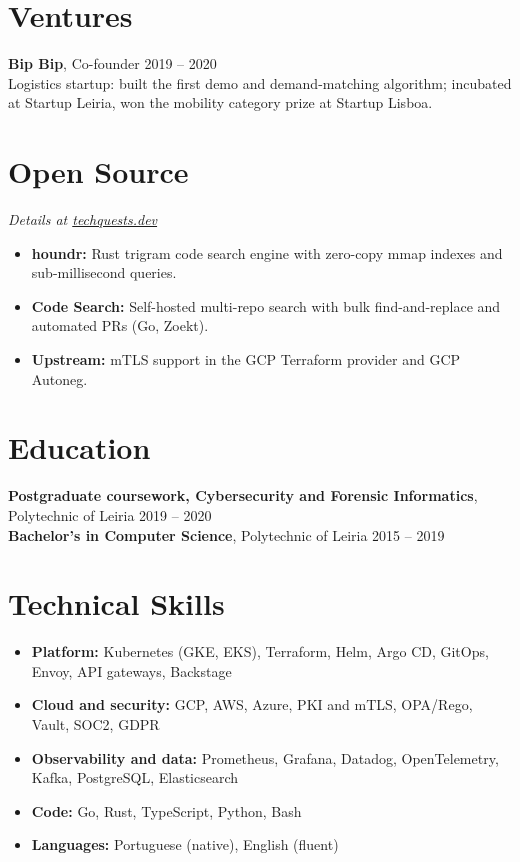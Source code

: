 \documentclass[a4paper,10pt]{article}
\newcommand{\mysectionrule}{\vspace{-4pt}\noindent{\color{rule}\rule{\linewidth}{0.5pt}}\par\vspace{4pt}}
\begin{document}
\section*{Ventures}
\mysectionrule
\textbf{Bip Bip}, Co-founder \hfill 2019 -- 2020 \\
Logistics startup: built the first demo and demand-matching algorithm; incubated at Startup Leiria, won the mobility category prize at Startup Lisboa.

\section*{Open Source}
\mysectionrule
\textit{Details at \href{https://techquests.dev}{techquests.dev}}
\begin{itemize}
  \item \textbf{houndr:} Rust trigram code search engine with zero-copy mmap indexes and sub-millisecond queries.
  \item \textbf{Code Search:} Self-hosted multi-repo search with bulk find-and-replace and automated PRs (Go, Zoekt).
  \item \textbf{Upstream:} mTLS support in the GCP Terraform provider and GCP Autoneg.
\end{itemize}

\section*{Education}
\mysectionrule
\textbf{Postgraduate coursework, Cybersecurity and Forensic Informatics}, Polytechnic of Leiria \hfill 2019 -- 2020 \\
\textbf{Bachelor's in Computer Science}, Polytechnic of Leiria \hfill 2015 -- 2019

\section*{Technical Skills}
\mysectionrule
\begin{itemize}
  \item \textbf{Platform:} Kubernetes (GKE, EKS), Terraform, Helm, Argo CD, GitOps, Envoy, API gateways, Backstage
  \item \textbf{Cloud and security:} GCP, AWS, Azure, PKI and mTLS, OPA/Rego, Vault, SOC2, GDPR
  \item \textbf{Observability and data:} Prometheus, Grafana, Datadog, OpenTelemetry, Kafka, PostgreSQL, Elasticsearch
  \item \textbf{Code:} Go, Rust, TypeScript, Python, Bash
  \item \textbf{Languages:} Portuguese (native), English (fluent)
\end{itemize}
\end{document}
